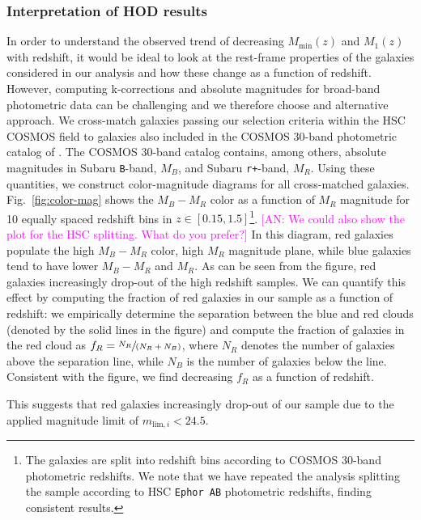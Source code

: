 \documentclass[a4paper,11pt]{article}
\newcommand{\an}[1]{{\textcolor{magenta}{[AN: #1]}}}
\begin{document}
    \subsubsection{Interpretation of HOD results}
      In order to understand the observed trend of decreasing $M_{\mathrm{min}}(z)$ and $M_{1}(z)$ with redshift, it would be ideal to look at the rest-frame properties of the galaxies considered in our analysis and how these change as a function of redshift. However, computing k-corrections and absolute magnitudes for broad-band photometric data can be challenging and we therefore choose and alternative approach. We cross-match galaxies passing our selection criteria within the HSC COSMOS field to galaxies also included in the COSMOS 30-band photometric catalog of \cite{2016ApJS..224...24L}. The COSMOS 30-band catalog contains, among others, absolute magnitudes in Subaru \texttt{B}-band, $M_{B}$, and Subaru \texttt{r+}-band, $M_{R}$. Using these quantities, we construct color-magnitude diagrams for all cross-matched galaxies. Fig.~\ref{fig:color-mag} shows the $M_{B}-M_{R}$ color as a function of $M_{R}$ magnitude for 10 equally spaced redshift bins in $z \in [0.15, 1.5]$\footnote{The galaxies are split into redshift bins according to COSMOS 30-band photometric redshifts. We note that we have repeated the analysis splitting the sample according to HSC \texttt{Ephor AB} photometric redshifts, finding consistent results.}. \an{We could also show the plot for the HSC splitting. What do you prefer?} In this diagram, red galaxies populate the high $M_{B}-M_{R}$ color, high $M_{R}$ magnitude plane, while blue galaxies tend to have lower $M_{B}-M_{R}$ and $M_{R}$. As can be seen from the figure, red galaxies increasingly drop-out of the high redshift samples. We can quantify this effect by computing the fraction of red galaxies in our sample as a function of redshift: we empirically determine the separation between the blue and red clouds (denoted by the solid lines in the figure) and compute the fraction of galaxies in the red cloud as $f_{R} = \sfrac{N_{R}}{(N_{R}+N_{B})}$, where $N_{R}$ denotes the number of galaxies above the separation line, while $N_{B}$ is the number of galaxies below the line. Consistent with the figure, we find decreasing $f_{R}$ as a function of redshift. 

      This suggests that red galaxies increasingly drop-out of our sample due to the applied magnitude limit of $m_{\mathrm{lim}, i} < 24.5$.

\end{document}
